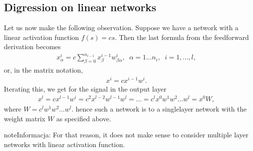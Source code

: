 \documentclass[a4paper,12pt,polish]{jupyterBook}
\begin{document}
\subsection{Digression on linear networks}
\label{\detokenize{docs/more_layers:digression-on-linear-networks}}
\sphinxAtStartPar
Let us now make the following observation. Suppose we have a network with a linear activation function \(f(s)=c s\). Then the last formula from the feed\sphinxhyphen{}forward derivation becomes
\begin{equation*}
\begin{split} 
x^i_\alpha  = c \sum_{\beta=0}^{n_{i-1}} x^{i-1}_\beta w^i_{\beta \alpha}, \;\; \alpha=1\dots n_i, \;\; i=1,\dots,l , 
\end{split}
\end{equation*}
\sphinxAtStartPar
or, in the matrix notation,
\begin{equation*}
\begin{split}
x^i = c x^{i-1} w^i.
\end{split}
\end{equation*}
\sphinxAtStartPar
Iterating this, we get for the signal in the output layer
\begin{equation*}
\begin{split}
x^l = c x^{l-1} w^i = c^2 x^{l-2} w^{l-1} w^l =\dots= c^l x^0 w^1 w^2 \dots w^l = 
x^0 W,
\end{split}
\end{equation*}
\sphinxAtStartPar
where \(W=c^l w^1 w^2 \dots w^l\). hence such a network is  to a single\sphinxhyphen{}layer network with the weight matrix \(W\) as specified above.

\begin{sphinxadmonition}{note}{Informacja:}
\sphinxAtStartPar
For that reason, it does not make sense to consider multiple layer networks with linear activation function.
\end{sphinxadmonition}
\end{document}

